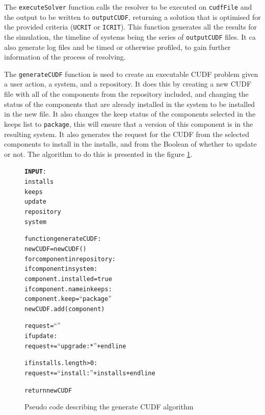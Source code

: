 The \verb+executeSolver+ function calls the resolver to be executed on \verb+cudfFile+ and the output to be written to \verb+outputCUDF+, 
returning a solution that is optimised for the provided criteria (\verb+UCRIT+ or \verb+ICRIT+).
This function generates all the results for the simulation, the timeline of systems being the series of \verb+outputCUDF+ files.
It ca also generate log files and be timed or otherwise profiled, to gain further information of the process of resolving.

The \verb+generateCUDF+ function is used to create an executable CUDF problem given a user action, a system, and a repository.
It does this by creating a new CUDF file with all of the components from the repository included, 
and changing the status of the components that are already installed in the system to be installed in the new file.
It also changes the keep status of the components selected in the keeps list to \verb+package+, this will ensure that a version of this component is in the resulting system.
It also generates the request for the CUDF from the selected components to install in the installs,
and from the Boolean of whether to update or not.
The algorithm to do this is presented in the figure \ref{generateCUDF}.

\begin{figure}[htp]
\begin{center}
\begin{alltt}
\textbf{INPUT}:
installs
keeps
update
repository
system


function generateCUDF:
    newCUDF = new CUDF()
    for component in repository:
        if component in system:
            component.installed = true
            if component.name in keeps:
                component.keep = ``package''
        newCUDF.add(component)
    
    request = ``''
    if update:
        request += ``upgrade: *'' + endline
        
    if installs.length > 0:
        request += ``install: ''  + installs + endline
    
    return newCUDF
\end{alltt}
\caption[Generate CUDF Pseudo Code]{Pseudo code describing the generate CUDF algorithm}
\label{generateCUDF}
\end{center}
\end{figure}

